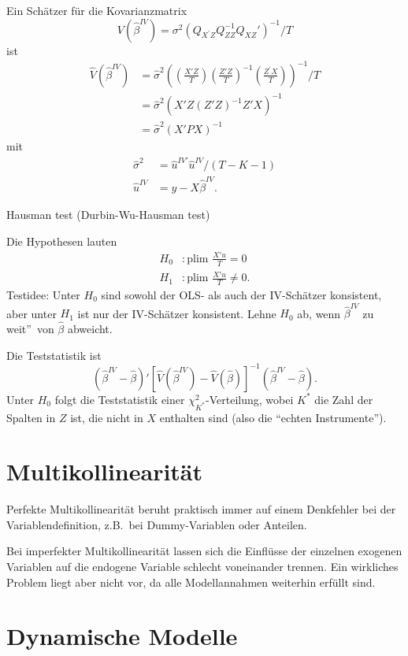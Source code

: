 \documentclass{article}
\begin{document}
Ein Schätzer für die Kovarianzmatrix 
\[ V(\hat\beta^{IV})=\sigma ^{2}\left( Q_{X^{\prime}Z}Q_{ZZ}^{-1}Q_{XZ}'\right) ^{-1}/T \]
ist
\begin{align*}
\hat{V}(\hat\beta^{IV}) 
&=\hat{\sigma}^{2}\left( \left( \frac{X'Z}{T}\right) \left( \frac{Z'Z}{T}\right) ^{-1}
\left( \frac{Z^{\prime}X}{T}\right) \right) ^{-1}/T \\
&=\hat{\sigma}^{2}\left( X'Z\left( Z'Z\right)^{-1}Z'X\right) ^{-1} \\
&=\hat{\sigma}^{2}\left( X'PX\right) ^{-1}
\end{align*}
mit
\begin{align*}
\hat{\sigma}^{2} &=\hat{u}^{IV\prime }\hat{u}^{IV}/(T-K-1) \\
\hat{u}^{IV} &= y-X\hat\beta^{IV}.
\end{align*}

Hausman test (Durbin-Wu-Hausman test)

Die Hypothesen lauten
\begin{align*}
H_{0} &:\textrm{plim }\frac{X'u}{T}=0 \\
H_{1} &:\textrm{plim }\frac{X'u}{T}\neq 0.
\end{align*}
Testidee: Unter $H_{0}$ sind sowohl der OLS- als auch der IV-Schätzer
konsistent, aber unter $H_{1}$ ist nur der IV-Schätzer konsistent.
Lehne $H_0$ ab, wenn $\hat{\beta}^{IV}$ \quotedblbase zu weit\textquotedblright\ 
von $\hat{\beta}$ abweicht.

Die Teststatistik ist
\[ (\hat{\beta}^{IV}-\hat{\beta})'
\left[\hat{V}(\hat{\beta}^{IV})-\hat{V}(\hat{\beta})\right]^{-1}
(\hat{\beta}^{IV}-\hat{\beta}). \]
Unter $H_{0}$ folgt die Teststatistik einer $\chi_{K^*}^2$-Verteilung,
wobei $K^*$ die Zahl der Spalten in $Z$ ist, die nicht in $X$ enthalten
sind (also die ``echten Instrumente'').

\section*{Multikollinearität}

Perfekte Multikollinearität beruht praktisch immer auf einem Denkfehler
bei der Variablendefinition, z.B.\ bei Dummy-Variablen oder Anteilen.

Bei imperfekter Multikollinearität lassen sich die Einflüsse der
einzelnen exogenen Variablen auf die endogene Variable schlecht
voneinander trennen. Ein wirkliches Problem liegt aber nicht vor,
da alle Modellannahmen weiterhin erfüllt sind.

\section{Dynamische Modelle}
\end{document}
